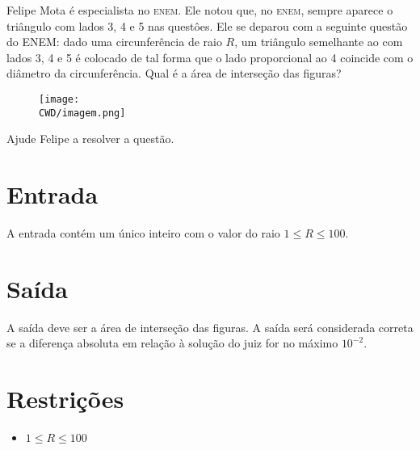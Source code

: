 %

Felipe Mota é especialista no \textsc{enem}. Ele notou que, no \textsc{enem}, sempre aparece o triângulo com lados 3, 4 e 5 nas questôes. Ele se deparou com a seguinte questão do \textsc{ENEM}: dado uma circunferência de raio $R$, um triângulo semelhante ao com lados 3, 4 e 5 é colocado de tal forma que o lado proporcional ao 4 coincide com o diâmetro da circunferência. Qual é a área de interseção das figuras?

\begin{figure}[H]
  \centering
  \texttt{[image: \\CWD/imagem.png]}
\end{figure}

Ajude Felipe a resolver a questão.

%
%

\section*{Entrada}

A entrada contém um único inteiro com o valor do raio $1 \leq R \leq 100$.

%
%

\section*{Saída}

A saída deve ser a área de interseção das figuras. A saída será considerada correta se a diferença absoluta em relação à solução do juiz for no máximo $10^{-2}$.

\section*{Restrições}

\begin{itemize}
\item $ 1 \leq R \leq 100$\end{itemize}


\exemplo
